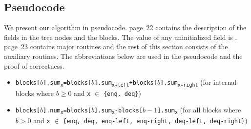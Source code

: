\documentclass[acmsmall,nonacm,anonymous]{acmart}
\newcommand{\sub}[1]{\textsubscript{#1}}
\renewcommand{\tt}[1]{\texttt{#1}}
\newcommand{\nf}[1]{{\normalfont{\texttt{#1}}}}
\begin{document}
\subsection{Pseudocode} \label{algQ}
We present our algorithm in pseudocode. page~22 contains the description of the fields in the tree nodes and the blocks. The value of any uninitialized field is \nf{null}. page~23 contains major routines and the rest of this section consists of the auxiliary routines. The abbreviations below are used in the pseudocode and the proof of correctness.
\begin{itemize}
 \item \tt{blocks[$b$].sum\sub{x}=blocks[$b$].sum\sub{x-left}+blocks[$b$].sum\sub{x-right}} (for internal blocks where $b\geq 0$ and \tt{x} $\in$ \tt{\{enq, deq\}})
  \item \tt{blocks[$b$].num\sub{x}=blocks[$b$].sum\sub{x}-blocks[$b-1$].sum\sub{x}}  (for all blocks where $b>0$ and \tt{x} $\in$ \tt{\{enq, deq, enq-left, enq-right, deq-left, deq-right\}})
\end{itemize}
\end{document}
